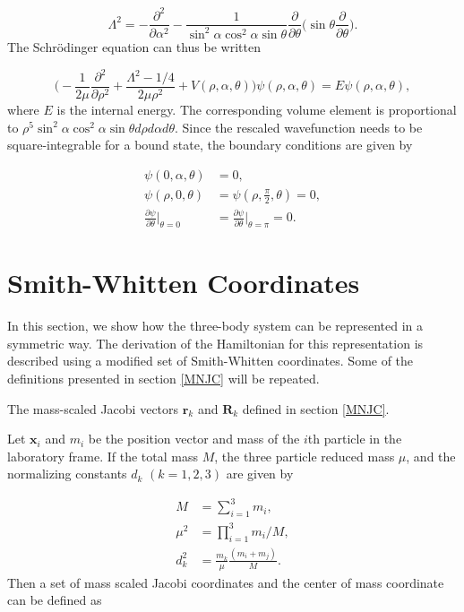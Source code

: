 \documentclass{article}
\numberwithin{equation}{section}
\numberwithin{figure}{section}
\begin{document}
\begin{equation}
\Lambda^2 = -\frac{\partial^2}{\partial\alpha^2} - \frac{1}{\sin^2\alpha\cos^2\alpha\sin\theta} \frac{\partial}{\partial\theta} \bigg( \sin\theta \frac{\partial}{\partial\theta}\bigg).
\end{equation}
The Schr{\"o}dinger equation can thus be written

\begin{equation}
\bigg(-\frac{1}{2\mu}\frac{\partial^2}{\partial\rho^2} + \frac{\Lambda^2 - 1/4}{2\mu\rho^2} + V(\rho,\alpha,\theta)\bigg) \psi(\rho,\alpha,\theta) = E \psi(\rho,\alpha,\theta),
\end{equation}
where $E$ is the internal energy. The corresponding volume element is proportional to $\rho^5\sin^2\alpha\cos^2\alpha\sin\theta d\rho d\alpha d\theta$. Since the rescaled wavefunction needs to be square-integrable for a bound state, the boundary conditions are given by

\begin{align}
	\psi(0,\alpha,\theta) &= 0,\\
	\psi(\rho,0,\theta)    &= \psi(\rho,\frac{\pi}{2},\theta) = 0,\\
	\frac{\partial\psi}{\partial\theta}\bigg\rvert_{\theta = 0} &= \frac{\partial\psi}{\partial\theta}\bigg\rvert_{\theta = \pi} = 0.
\end{align}   

\section{Smith-Whitten Coordinates}\label{smith}
In this section, we show how the three-body system can be represented in a symmetric way. The derivation of the Hamiltonian for this representation is described using a modified set of Smith-Whitten coordinates. Some of the definitions presented in section \cref{MNJC} will be repeated.

The mass-scaled Jacobi vectors $\mathbf{r}_k$ and $\mathbf{R}_k$ defined in section \cref{MNJC}. 

Let $\mathbf{x}_i$ and $m_{i}$ be the position vector and mass of the $i$th particle in the laboratory frame. If the total mass $M$, the three particle reduced mass $\mu$, and the normalizing constants $d_{k}$ $(k=1,2,3)$ are given by

\begin{align}
M &= \sum_{i=1}^{3}m_i, \\
\mu^2 &= \prod_{i=1}^{3}m_i/M,\\
d_k^2 &= \frac{m_k}{\mu}\frac{(m_i+m_j)}{M}.
\end{align}
Then a set of mass scaled Jacobi coordinates and the center of mass coordinate can be defined as
\end{document}
